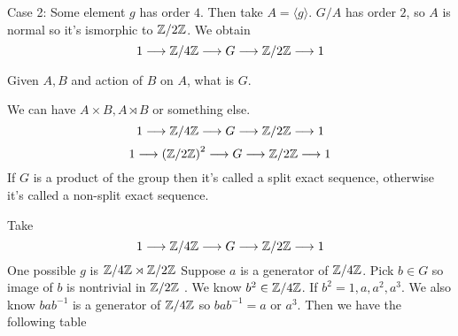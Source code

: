 Case 2: Some element $g$ has order $4$. Then take $A = \langle g \rangle$. $G/A$ has order $2$, so $A$ is normal so it's ismorphic to $\mathbb Z/ 2 \mathbb Z$. We obtain
\[ 1 \longrightarrow \mathbb Z/ 4 \mathbb Z \longrightarrow G \longrightarrow \mathbb Z/ 2 \mathbb Z \longrightarrow 1\]
\begin{problem}
	Given $A,B$ and action of $B$ on $A$, what is $G$.
\end{problem}
\begin{answer}
	We can have $A \times B, A \rtimes B$ or something else.
	\[ 1 \longrightarrow \mathbb Z/ 4 \mathbb Z \longrightarrow G \longrightarrow \mathbb Z/ 2 \mathbb Z \longrightarrow 1\]
	\[ 1 \longrightarrow \left( \mathbb Z/ 2 \mathbb Z \right)^2  \longrightarrow G \longrightarrow \mathbb Z/ 2 \mathbb Z \longrightarrow 1\]
	If $G$ is a product of the group then it's called a split exact sequence, otherwise it's called a non-split exact sequence.
\end{answer}
Take \[ 1 \longrightarrow  \mathbb Z/ 4 \mathbb Z   \longrightarrow G \longrightarrow \mathbb Z/ 2 \mathbb Z \longrightarrow 1\]
One possible $g$ is $\mathbb Z/ 4 \mathbb Z \rtimes \mathbb Z/ 2 \mathbb Z $
Suppose $a$ is a generator of $\mathbb Z/ 4 \mathbb Z$. Pick $b \in G$ so image of $b$ is nontrivial in $\mathbb Z/ 2 \mathbb Z $ . We know $b^2 \in \mathbb Z/ 4 \mathbb Z$. If $b^2 = 1,a,a^2,a^3$. We also know $bab^{-1}$ is a generator of $\mathbb Z/ 4 \mathbb Z$ so $bab^{-1} = a$ or $a^3$. Then we have the following table 


